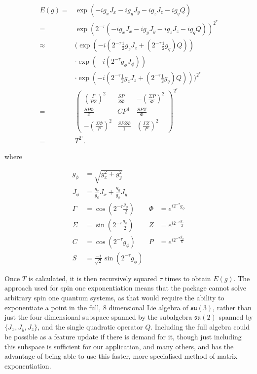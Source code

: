 \documentclass{jors}
\begin{document}
			\begin{align}
                E(g) =& \exp\left(-ig_x J_x - ig_y J_y - ig_z J_z - ig_q Q\right)\\
                =& \exp\left(2^{-\tau}\left(-ig_x J_x - ig_y J_y - ig_z J_z - ig_q Q\right)\right)^{2^\tau}\\
                \approx& \biggl(\exp\left(-i\left(2^{-\tau} \frac12g_z J_z + \left(2^{-\tau}\frac12g_q\right) Q\right)\right)\nonumber\\
				&\cdot\exp\left(-i\left(2^{-\tau} g_\phi J_\phi\right)\right)\nonumber\\
				&\cdot\exp\left(-i\left(2^{-\tau} \frac12g_z J_z + \left(2^{-\tau} \frac12g_q\right) Q\right)\right)\biggr)^{2^\tau}\\
                =& \begin{pmatrix}
                    \left(\frac{\Gamma}{PZ}\right)^2 & \frac{SP}{Z\Phi} & -\left(\frac{\Sigma P}{\Phi}\right)^2 \\
					\frac{SP\Phi}{Z} & CP^4 & \frac{SPZ}{\Phi} \\
					-\left(\frac{\Sigma \Phi}{P}\right)^2 & \frac{SPZ\Phi}{1} & \left(\frac{\Gamma Z}{P}\right)^2
                \end{pmatrix}^{2^\tau}\\
				=& T^{2^\tau}.
            \end{align}

			where

            \begin{align}
				g_\phi &= \sqrt{g_x^2 + g_y^2}&&\nonumber\\
				J_\phi &= \frac{g_x}{g_\phi}J_x + \frac{g_y}{g_\phi}J_y&&\nonumber\\
				\Gamma &= \cos\left(2^{-\tau} \frac{g_\phi}{2}\right) & \Phi &= e^{i2^{-\tau}g_\phi}\nonumber\\
				\Sigma &= \sin\left(2^{-\tau} \frac{g_\phi}{2}\right) & Z &= e^{i2^{-\tau}\frac{g_z}{2}}\nonumber\\
				C &= \cos(2^{-\tau} g_\phi) & P &= e^{i2^{-\tau}\frac{g_q}{6}}\nonumber\\
				S &= \frac{-i}{\sqrt2}\sin(2^{-\tau} g_\phi)&&
            \end{align}
        
			Once \(T\) is calculated, it is then recursively squared \(\tau\) times to obtain \(E(g)\). The approach used for spin one exponentiation means that the package cannot solve arbitrary spin one quantum systems, as that would require the ability to exponentiate a point in the full, 8 dimensional Lie algebra of \(\mathfrak{su}(3)\), rather than just the four dimensional subspace spanned by the subalgebra \(\mathfrak{su}(2)\) spanned by \(\{J_x, J_y, J_z\}\), and the single quadratic operator \(Q\). Including the full algebra could be possible as a feature update if there is demand for it, though just including this subspace is sufficient for our application, and many others, and has the advantage of being able to use this faster, more specialised method of matrix exponentiation.
\end{document}
